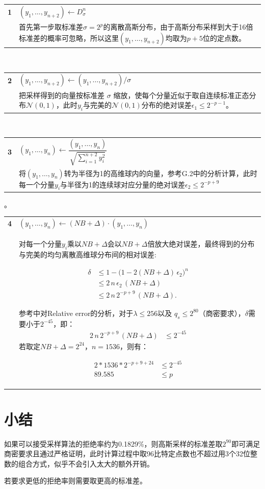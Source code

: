 \documentclass{article}
\newcommand{\Explainsize}{\normalsize}
\newcommand{\ExplainColor}{black!85}
\newcommand{\ExplainVSkip}{12pt}
\newcommand{\CodeItem}[3]{%
  \noindent\begin{tabularx}{\textwidth}{r X}
    \textbf{#1} & $\displaystyle #2$ \\[6pt]
    & {\setlength{\parindent}{0pt}\Explainsize\color{\ExplainColor}\parbox[t]{\hsize}{#3}} \\[\ExplainVSkip]
  \end{tabularx}%
}
\begin{document}
\begin{tcolorbox}[colback=white, colframe=gray!30, boxrule=0.6pt, arc=3pt, left=6pt, right=6pt]
\CodeItem{1}{(y_1,\dots,y_{n+2}) \leftarrow D^n_\sigma}{ 首先第一步取标准差$\sigma= 2^{p}$的离散高斯分布，由于高斯分布采样到大于16倍标准差的概率可忽略，所以这里$(y_1,\dots,y_{n+2})$均取为$p+5$位的定点数。}
\\
\newline

\CodeItem{2}{(y_1,\dots,y_{n+2}) \leftarrow (y_1,\dots,y_{n+2})/\sigma}{把采样得到的向量按标准差 \(\sigma\) 缩放，使每个分量近似于取自连续标准正态分布\( \mathcal{N}(0,1) \)，此时$y_i$与完美的\( \mathcal{N}(0,1) \)分布的绝对误差$\epsilon_1 \leq 2^{-p-1}$。}
\\
\newline

\CodeItem{3}{(y_1,\dots,y_n) \leftarrow  \dfrac{(y_1,\dots,y_n)}{\sqrt{\sum_{i=1}^{n+2} y_i^2}}}{将$(y_1,\dots,y_{n})$转为半径为1的高维球内的向量，参考\cite{cheon2024haetae}G.2中的分析计算，此时每一个分量$y_i$与半径为1的连续球对应分量的绝对误差$\epsilon_2 \leq 2^{-p+9}$}。
\\
\newline


\CodeItem{4}{(y_1,\dots,y_{n}) \leftarrow (NB+\Delta) \cdot (y_1,\dots,y_{n})}{对每一个分量$y_i$乘以$NB+\Delta$会以$NB+\Delta$倍放大绝对误差，最终得到的分布与完美的均匀离散高维球分布间的相对误差:

\[
\begin{aligned}
\delta &\le 1 - \bigl(1 - 2(NB+\Delta)\,\epsilon_2\bigr)^n \\[4pt]
       &\le 2\,n\,\epsilon_2\,(NB+\Delta) \\[4pt]
       &\le 2\,n\,2^{-p+9}\,(NB+\Delta).
\end{aligned}
\]

 参考\cite{prest2017sharper}中对Relative error的分析，对于$\lambda \le 256 $以及 $q_s \le 2^{80} $（商密要求），$\delta$需要小于$2^{-45}$，即：
\[
\begin{aligned}
        2\,n\,2^{-p+9}\,(NB+\Delta) &\le 2^{-45} 
\end{aligned}
\]
  若取定$NB+\Delta = 2^{24}$，$n=1536$，则有：

  \[
\begin{aligned}
        2*1536*2^{-p+9+24} &\le 2^{-45}  \\[4pt]
        89.585 & \le p 
\end{aligned}
\]
 
}
\end{tcolorbox}
   

\section{小结}

    如果可以接受采样算法的拒绝率约为0.1829\%，则高斯采样的标准差取$2^{90}$即可满足商密要求且通过严格证明，此时计算过程中取96比特定点数也不超过用3个32位整数的组合方式，似乎不会引入太大的额外开销。
    
    若要求更低的拒绝率则需要取更高的标准差。







\end{document}
